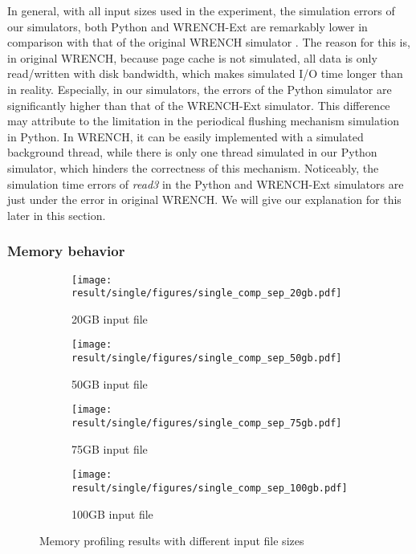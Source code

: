 \documentclass[conference]{IEEEtran}
\begin{document}
			In general, with all input sizes used in the experiment, the simulation errors 
			of our simulators, both Python and WRENCH-Ext are remarkably lower 
			in comparison with that of the original WRENCH simulator . 
			The reason for this is, in original WRENCH, because page cache is not simulated, 
			all data is only read/written with disk bandwidth, which makes simulated 
			I/O time longer than in reality.
			Especially, in our simulators, the errors of the Python simulator are significantly 
			higher than that of the WRENCH-Ext simulator. 
			This difference may attribute to the limitation in the periodical flushing 
			mechanism simulation in Python. 
			In WRENCH, it can be easily implemented with a simulated background thread, 
			while there is only one thread simulated in our Python simulator, which 
			hinders the correctness of this mechanism. 
			Noticeably, the simulation time errors of \textit{read3} in the Python and 
			WRENCH-Ext simulators are just under the error in original WRENCH. 
			We will give our explanation for this later in this section.
			
		\subsubsection{Memory behavior}
		
			\begin{figure*}
			\begin{subfigure}{\columnwidth}
				\centering
   				\texttt{[image: result/single/figures/single\_comp\_sep\_20gb.pdf]}
   				\caption{20GB input file}	\label{fig:single_memprof_20gb}
			\end{subfigure}	
			\begin{subfigure}{\columnwidth}
				\centering
   				\texttt{[image: result/single/figures/single\_comp\_sep\_50gb.pdf]}
   				\caption{50GB input file}	\label{fig:single_memprof_50gb}
			\end{subfigure}	
			\begin{subfigure}{\columnwidth}
				\centering
   				\texttt{[image: result/single/figures/single\_comp\_sep\_75gb.pdf]}
   				\caption{75GB input file}	\label{fig:single_memprof_75gb}
			\end{subfigure}	
			\begin{subfigure}{\columnwidth}
				\centering
   				\texttt{[image: result/single/figures/single\_comp\_sep\_100gb.pdf]}
   				\caption{100GB input file}	\label{fig:single_memprof_100gb}
			\end{subfigure}	
			\caption{Memory profiling results with different input file sizes}
			\label{fig:single_memprof}
			\end{figure*}			
			
\end{document}
